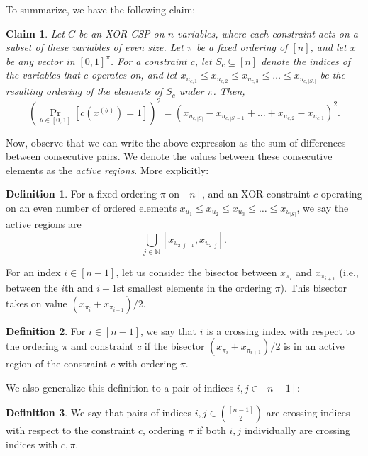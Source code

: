 \documentclass[11pt]{article}
\newtheorem{claim}[theorem]{Claim}
\theoremstyle{definition}
\newtheorem{definition}{Definition}[section]
\newcommand{\N}{\mathbb{N}}
\begin{document}
To summarize, we have the following claim:

\begin{claim}\label{clm:fixedOrderingExp}
    Let $C$ be an XOR CSP on $n$ variables, where each constraint acts on a subset of these variables of even size. Let $\pi$ be a fixed ordering of $[n]$, and let $x$ be any vector in $[0,1]^{\pi}$. For a constraint $c$, let $S_c \subseteq [n]$ denote the indices of the variables that $c$ operates on, and let 
    $x_{u_{c, 1}} \leq x_{u_{c, 2}} \leq x_{u_{c, 3}} \leq \dots \leq x_{u_{c, |S_c|}}$ be the resulting ordering of the elements of $S_c$ under $\pi$. Then,
    \[
    \left(\Pr_{\theta \in [0,1]}[c(x^{(\theta)}) = 1] \right)^2 = (x_{u_{c, |S|}} - x_{u_{c, |S|-1}} + \dots + x_{u_{c, 2}} - x_{u_{c, 1}})^2.
    \]
\end{claim}
 
 Now, observe that we can write the above expression as the sum of differences between consecutive pairs. We denote the values between these consecutive elements as the \emph{active regions}. More explicitly:

\begin{definition}
    For a fixed ordering $\pi$ on $[n]$, and an XOR constraint $c$ operating on an even number of ordered elements $x_{u_1} \leq x_{u_2} \leq x_{u_3} \leq \dots \leq x_{u_{|S|}}$, we say the active regions are 
    \[
    \bigcup_{j \in \N} [x_{u_{2 \cdot j-1}}, x_{u_{2 \cdot j}}].
    \]
\end{definition}

For an index $i \in [n-1]$, let us consider the bisector between $x_{\pi_i}$ and $x_{\pi_{i+1}}$ (i.e., between the $i$th and $i+1$st smallest elements in the ordering $\pi$). This bisector takes on value $(x_{\pi_i} + x_{\pi_{i+1}}) / 2$. 

\begin{definition}
For $i \in [n-1]$, we say that $i$ is a crossing index with respect to the ordering $\pi$ and constraint $c$ if the bisector $(x_{\pi_i} + x_{\pi_{i+1}}) / 2$ is in an active region of the constraint $c$ with ordering $\pi$.
\end{definition}

We also generalize this definition to a pair of indices $i,j \in [n-1]$:

\begin{definition}
    We say that pairs of indices $i,j \in \binom{[n-1]}{2}$ are crossing indices with respect to the constraint $c$, ordering $\pi$ if both $i, j$ individually are crossing indices with $c, \pi$.
\end{definition}
\end{document}
